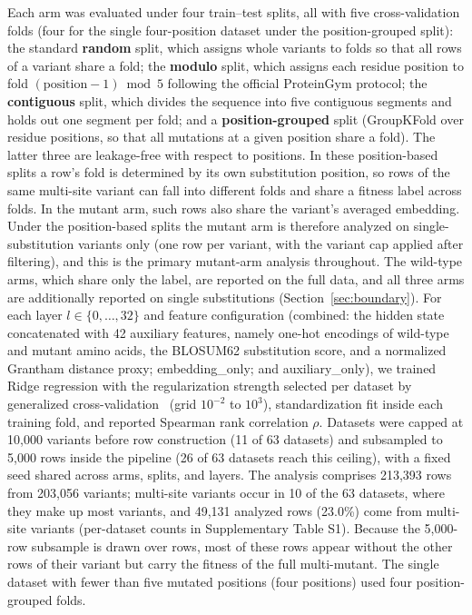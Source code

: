 \documentclass[numbered,webpdf,modern,large]{oup-authoring-template}
\newcommand{\rone}[1]{#1}
\newcommand{\rtwo}[1]{#1}
\newcommand{\rthree}[1]{#1}
\begin{document}
\rone{Each arm was evaluated under four train--test splits, all with five
cross-validation folds (four for the single four-position dataset under the
position-grouped split): the standard \textbf{random} split\rtwo{, which assigns whole
variants to folds so that all rows of a variant share a fold}; the \textbf{modulo}
split, which assigns each residue position to fold $(\text{position} - 1) \bmod 5$
following the official ProteinGym protocol; the \textbf{contiguous} split, which
divides the sequence into five contiguous segments and holds out one segment per
fold; and a \textbf{position-grouped} split (GroupKFold over residue positions, so
that all mutations at a given position share a fold). The latter three are
leakage-free with respect to positions. \rtwo{In these position-based splits a row's
fold is determined by its own substitution position, so rows of the same multi-site
variant can fall into different folds and share a fitness label across folds\rthree{.
In the mutant arm, such rows also share the variant's averaged embedding. Under the
position-based splits the mutant arm is therefore analyzed on single-substitution
variants only (one row per variant, with the variant cap applied after filtering),
and this is the primary mutant-arm analysis throughout. The wild-type arms, which share
only the label, are reported on the full data, and all three arms are additionally
reported on single substitutions (Section~\ref{sec:boundary}).}} For each layer $l \in \{0,\dots,32\}$ and
feature configuration (combined: the hidden state concatenated with 42 auxiliary
features, namely one-hot encodings of wild-type and mutant amino acids, the BLOSUM62
substitution score, and a normalized Grantham distance proxy; embedding\_only; and
auxiliary\_only), we trained Ridge regression with the regularization strength
selected per dataset by generalized cross-validation~\cite{golub1979generalized}
(grid $10^{-2}$ to $10^{3}$), standardization fit inside each training fold, and
reported Spearman rank correlation $\rho$. \rtwo{Datasets were capped at 10,000
variants before row construction (11 of 63 datasets) and subsampled to 5,000 rows
inside the pipeline (26 of 63 datasets reach this ceiling)}, with a fixed seed shared
across arms, splits, and layers. \rtwo{The analysis comprises 213,393 rows from 203,056
variants; multi-site variants occur in 10 of the 63 datasets\rthree{, where they make
up most variants, and 49,131 analyzed rows (23.0\%) come from multi-site variants
(per-dataset counts in Supplementary Table S1). Because the 5,000-row subsample is
drawn over rows, most of these rows appear without the other rows of their variant
but carry the fitness of the full multi-mutant.}} The single
dataset with fewer than five mutated positions (four positions) used four
position-grouped folds.}
\end{document}
